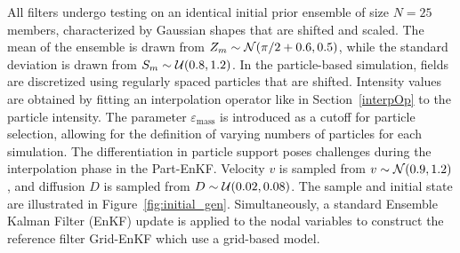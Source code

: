 All filters undergo testing on an identical initial prior ensemble of size $N = 25$ members, characterized by Gaussian shapes that are shifted and scaled. The mean of the ensemble is drawn from $Z_m \sim \mathcal{N}(\pi/2 + 0.6, 0.5)$, while the standard deviation is drawn from $S_m \sim \mathcal{U}(0.8, 1.2)$.
In the particle-based simulation, fields are discretized using regularly spaced particles that are shifted. Intensity values are obtained by fitting an interpolation operator like in Section~\ref{interpOp} to the particle intensity.
The parameter $\varepsilon_{\text{mass}}$ is introduced as a cutoff for particle selection, allowing for the definition of varying numbers of particles for each simulation. The differentiation in particle support poses challenges during the interpolation phase in the Part-EnKF.
Velocity $v$ is sampled from $v \sim \mathcal{N}(0.9, 1.2)$, and diffusion $D$ is sampled from $D \sim \mathcal{U}(0.02, 0.08)$. The sample and initial state are illustrated in Figure~\ref{fig:initial_gen}.
Simultaneously, a standard Ensemble Kalman Filter (EnKF) update is applied to the nodal variables to construct the reference filter Grid-EnKF which use a grid-based model.

